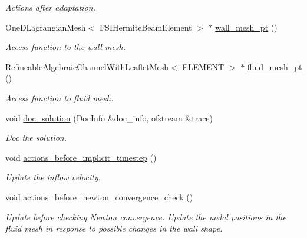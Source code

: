\begin{DoxyCompactItemize}
\begin{DoxyCompactList}\small\item\em Actions after adaptation. \end{DoxyCompactList}\item 
One\+D\+Lagrangian\+Mesh$<$ F\+S\+I\+Hermite\+Beam\+Element $>$ $\ast$ \hyperlink{classFSIChannelWithLeafletProblem_ab6a1c532882a71ddd576c752da389de0}{wall\+\_\+mesh\+\_\+pt} ()
\begin{DoxyCompactList}\small\item\em Access function to the wall mesh. \end{DoxyCompactList}\item 
Refineable\+Algebraic\+Channel\+With\+Leaflet\+Mesh$<$ E\+L\+E\+M\+E\+NT $>$ $\ast$ \hyperlink{classFSIChannelWithLeafletProblem_aec9244497829f9a85cbca7307c4d4e10}{fluid\+\_\+mesh\+\_\+pt} ()
\begin{DoxyCompactList}\small\item\em Access function to fluid mesh. \end{DoxyCompactList}\item 
void \hyperlink{classFSIChannelWithLeafletProblem_a055f124f38dca43bc3ed36b80c5c0880}{doc\+\_\+solution} (Doc\+Info \&doc\+\_\+info, ofstream \&trace)
\begin{DoxyCompactList}\small\item\em Doc the solution. \end{DoxyCompactList}\item 
void \hyperlink{classFSIChannelWithLeafletProblem_ac73220fa534cf2409bb0ebcf2fb5e1d5}{actions\+\_\+before\+\_\+implicit\+\_\+timestep} ()
\begin{DoxyCompactList}\small\item\em Update the inflow velocity. \end{DoxyCompactList}\item 
void \hyperlink{classFSIChannelWithLeafletProblem_aff02228eddae18ef3d57306ba1e61495}{actions\+\_\+before\+\_\+newton\+\_\+convergence\+\_\+check} ()
\begin{DoxyCompactList}\small\item\em Update before checking Newton convergence\+: Update the nodal positions in the fluid mesh in response to possible changes in the wall shape. \end{DoxyCompactList}\end{DoxyCompactItemize}
